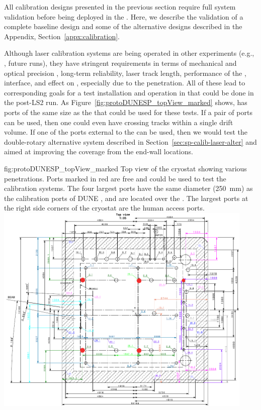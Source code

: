 
All calibration designs presented in the previous section require full system validation before being deployed in the  . Here, we describe the validation of a complete baseline design and some of the alternative designs described in the Appendix, Section~\ref{appx:calibration}.

Although laser calibration systems are being operated in other  experiments (e.g., , future  runs), they have stringent requirements in terms of mechanical and optical precision , long-term reliability, laser track length, performance of the ,  interface, and effect on \efield, especially due to the  penetration. 
All of these lead to corresponding goals for a test installation and operation in  that could be done in the post-LS2 run. As Figure~\ref{fig:protoDUNESP_topView_marked} shows,  has ports of the same size as the   that could be used for these tests. If a pair of ports can be used, then one could even have crossing tracks within a single drift volume. If one of the ports external to the  can be used, then we would test the double-rotary alternative system described in Section~\ref{sec:sp-calib-laser-alter} and aimed at improving the coverage from the end-wall locations.

\begin{dunefigure}{fig:protoDUNESP_topView_marked}
{Top view of the  cryostat showing various penetrations. Ports marked in red are free and could be used to test the calibration systems. The four largest ports have the same diameter (\SI{250}{\milli\m}) as the calibration ports of DUNE , and are located over the . The largest ports at the right side corners of the cryostat are the human access ports.}
\includegraphics[height=4.0in]{graphics/protoDUNESP_topView_marked.png}
\end{dunefigure}

